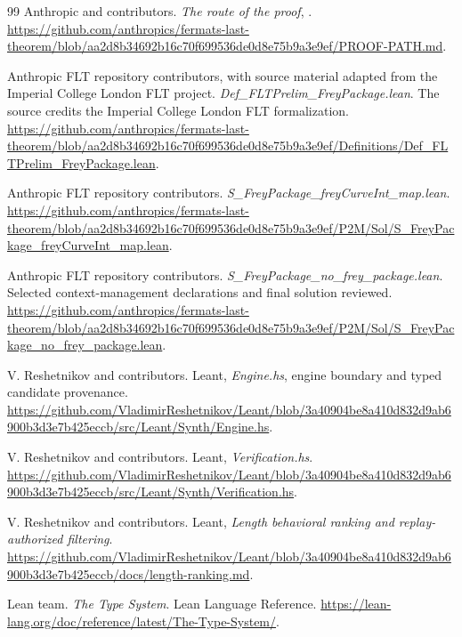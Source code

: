 \documentclass[11pt,letterpaper]{article}
\theoremstyle{definition}\newtheorem{definition}[theorem]{Definition}
\newcommand{\code}[1]{\texttt{\detokenize{#1}}}
\begin{document}
\begin{thebibliography}{99}
Anthropic and contributors. \emph{The route of the proof}, \code{PROOF-PATH.md}.\newline
\url{https://github.com/anthropics/fermats-last-theorem/blob/aa2d8b34692b16c70f699536de0d8e75b9a3e9ef/PROOF-PATH.md}.

Anthropic FLT repository contributors, with source material adapted from the Imperial College London FLT project. \emph{Def\_FLTPrelim\_FreyPackage.lean}. The source credits the Imperial College London FLT formalization.\newline
\url{https://github.com/anthropics/fermats-last-theorem/blob/aa2d8b34692b16c70f699536de0d8e75b9a3e9ef/Definitions/Def_FLTPrelim_FreyPackage.lean}.

Anthropic FLT repository contributors. \emph{S\_FreyPackage\_freyCurveInt\_map.lean}.\newline
\url{https://github.com/anthropics/fermats-last-theorem/blob/aa2d8b34692b16c70f699536de0d8e75b9a3e9ef/P2M/Sol/S_FreyPackage_freyCurveInt_map.lean}.

Anthropic FLT repository contributors. \emph{S\_FreyPackage\_no\_frey\_package.lean}. Selected context-management declarations and final solution reviewed.\newline
\url{https://github.com/anthropics/fermats-last-theorem/blob/aa2d8b34692b16c70f699536de0d8e75b9a3e9ef/P2M/Sol/S_FreyPackage_no_frey_package.lean}.

V. Reshetnikov and contributors. Leant, \emph{Engine.hs}, engine boundary and typed candidate provenance.\newline
\url{https://github.com/VladimirReshetnikov/Leant/blob/3a40904be8a410d832d9ab6900b3d3e7b425eccb/src/Leant/Synth/Engine.hs}.

V. Reshetnikov and contributors. Leant, \emph{Verification.hs}.\newline
\url{https://github.com/VladimirReshetnikov/Leant/blob/3a40904be8a410d832d9ab6900b3d3e7b425eccb/src/Leant/Synth/Verification.hs}.

V. Reshetnikov and contributors. Leant, \emph{Length behavioral ranking and replay-authorized filtering}.\newline
\url{https://github.com/VladimirReshetnikov/Leant/blob/3a40904be8a410d832d9ab6900b3d3e7b425eccb/docs/length-ranking.md}.

Lean team. \emph{The Type System}. Lean Language Reference.\newline
\url{https://lean-lang.org/doc/reference/latest/The-Type-System/}.


\end{thebibliography}
\end{document}
